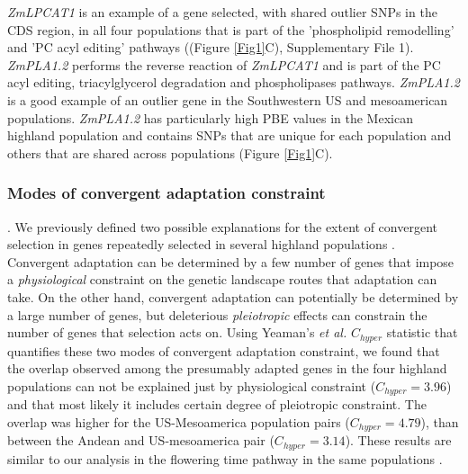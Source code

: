 \documentclass[9pt,twocolumn,twoside,lineno]{BioRxiv}
\begin{document}
\textit{ZmLPCAT1} is an example of a gene selected, with shared outlier SNPs in the CDS region, in all four populations that is part of the 'phospholipid remodelling' and 'PC acyl editing' pathways ((Figure \ref{Fig1}C), Supplementary File 1).
\textit{ZmPLA1.2} performs the reverse reaction of \textit{ZmLPCAT1} and is part of the PC acyl editing, triacylglycerol degradation and phospholipases pathways. 
\textit{ZmPLA1.2} is a good example of an outlier gene in the Southwestern US and mesoamerican populations.
\textit{ZmPLA1.2} has particularly high PBE values in the Mexican highland population and contains SNPs that are unique for each population and others that are shared across populations (Figure \ref{Fig1}C). 

\subsubsection{Modes of convergent adaptation constraint}. 
We previously defined two possible explanations for the extent of convergent selection in genes repeatedly selected in several highland populations \cite{Wang2020-mp, yeaman2018}. 
Convergent adaptation can be determined by a few number of genes that impose a \textit{physiological} constraint on the genetic landscape routes that adaptation can take. 
On the other hand, convergent adaptation can potentially be determined by a large number of genes, but deleterious \textit{pleiotropic} effects can constrain the number of genes that selection acts on.  
Using Yeaman's \textit{et al.} $C_{hyper}$ statistic \cite{yeaman2018} that quantifies these two modes of convergent adaptation constraint, we found that the overlap observed among the presumably adapted genes in the four highland populations can not be explained just by physiological constraint ($C_{hyper} = 3.96$) and that most likely it includes certain degree of pleiotropic constraint.
The overlap was higher for the US-Mesoamerica population pairs ($C_{hyper} = 4.79$), than between the Andean and US-mesoamerica pair ($C_{hyper} = 3.14$).
These results are similar to our analysis in the flowering time pathway in the same populations \cite{Wang2020-mp}. 
\end{document}
